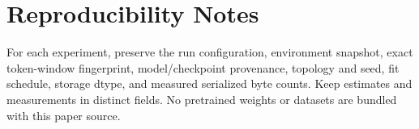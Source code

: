 \section{Reproducibility Notes}
For each experiment, preserve the run configuration, environment snapshot, exact token-window fingerprint, model/checkpoint provenance, topology and seed, fit schedule, storage dtype, and measured serialized byte counts. Keep estimates and measurements in distinct fields. No pretrained weights or datasets are bundled with this paper source.
